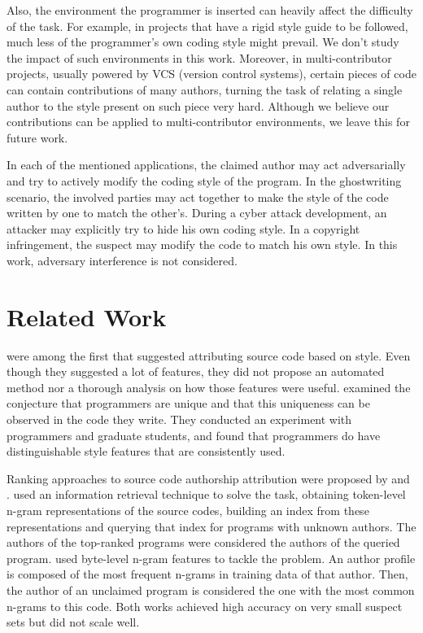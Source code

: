 Also, the environment the programmer is inserted can heavily affect the difficulty of the task. For example, in projects that have a rigid style guide to be followed, much less of the programmer's own coding style might prevail. We don't study the impact of such environments in this work. Moreover, in multi-contributor projects, usually powered by VCS (version control systems), certain pieces of code can contain contributions of many authors, turning the task of relating a single author to the style present on such piece very hard. Although we believe our contributions can be applied to multi-contributor environments, we leave this for future work.

In each of the mentioned applications, the claimed author may act adversarially and try to actively modify the coding style of the program. In the ghostwriting scenario, the involved parties may act together to make the style of the code written by one to match the other's. During a cyber attack development, an attacker may explicitly try to hide his own coding style. In a copyright infringement, the suspect may modify the code to match his own style. In this work, adversary interference is not considered.

\section{Related Work}

 were among the first that suggested attributing source code based on style. Even though they suggested a lot of features, they did not propose an automated method nor a thorough analysis on how those features were useful.  examined the conjecture that programmers are unique and that this uniqueness can be observed in the code they write. They conducted an experiment with programmers and graduate students, and found that programmers do have distinguishable style features that are consistently used.

Ranking approaches to source code authorship attribution were proposed by  and .  used an information retrieval technique to solve the task, obtaining token-level n-gram representations of the source codes, building an index from these representations and querying that index for programs with unknown authors. The authors of the top-ranked programs were considered the authors of the queried program.  used byte-level n-gram features to tackle the problem. An author profile is composed of the most frequent n-grams in training data of that author. Then, the author of an unclaimed program is considered the one with the most common n-grams to this code. Both works achieved high accuracy on very small suspect sets but did not scale well.

